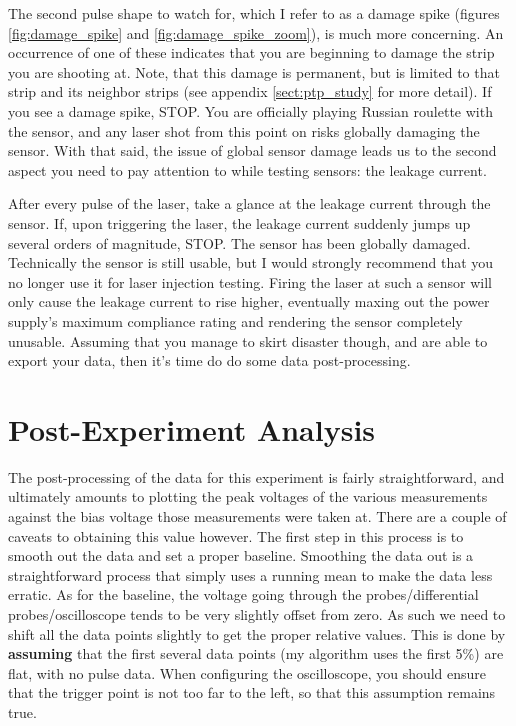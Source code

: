 \documentclass{report}
\begin{document}
            The second pulse shape to watch for, which I refer to as a damage spike (figures \ref{fig:damage_spike} and \ref{fig:damage_spike_zoom}), is much more concerning. An occurrence of one of these indicates that you are beginning to damage the strip you are shooting at. Note, that this damage is permanent, but is limited to that strip and its neighbor strips (see appendix \ref{sect:ptp_study} for more detail). If you see a damage spike, STOP. You are officially playing Russian roulette with the sensor, and any laser shot from this point on risks globally damaging the sensor. With that said, the issue of global sensor damage leads us to the second aspect you need to pay attention to while testing sensors: the leakage current.

            After every pulse of the laser, take a glance at the leakage current through the sensor. If, upon triggering the laser, the leakage current suddenly jumps up several orders of magnitude, STOP. The sensor has been globally damaged. Technically the sensor is still usable, but I would strongly recommend that you no longer use it for laser injection testing. Firing the laser at such a sensor will only cause the leakage current to rise higher, eventually maxing out the power supply's maximum compliance rating and rendering the sensor completely unusable. Assuming that you manage to skirt disaster though, and are able to export your data, then it's time do do some data post-processing.

        \section{ Post-Experiment Analysis }
            The post-processing of the data for this experiment is fairly straightforward, and ultimately amounts to plotting the peak voltages of the various measurements against the bias voltage those measurements were taken at. There are a couple of caveats to obtaining this value however. The first step in this process is to smooth out the data and set a proper baseline. Smoothing the data out is a straightforward process that simply uses a running mean to make the data less erratic. As for the baseline, the voltage going through the probes/differential probes/oscilloscope tends to be very slightly offset from zero. As such we need to shift all the data points slightly to get the proper relative values. This is done by \textbf{assuming} that the first several data points (my algorithm uses the first 5\%) are flat, with no pulse data. When configuring the oscilloscope, you should ensure that the trigger point is not too far to the left, so that this assumption remains true.
\end{document}
